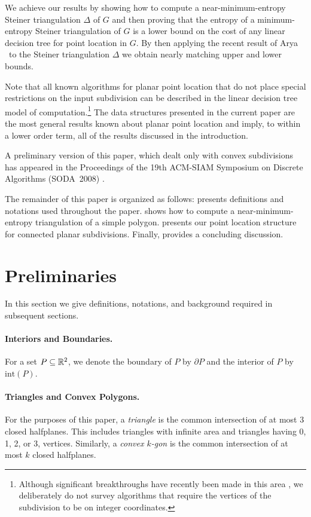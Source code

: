 \documentclass[lotsofwhite]{patmorin}
\newcommand{\boundary}{\partial}
\newcommand{\interior}{\mathrm{int}}
\begin{document}
We achieve our results by showing how to compute a
near-minimum-entropy Steiner triangulation $\Delta$ of $G$ and then
proving that the entropy of a minimum-entropy Steiner triangulation of
$G$ is a lower bound on the cost of any linear decision tree for point
location in $G$.  By then applying the recent result of Arya \etal\ to
the Steiner triangulation $\Delta$ we obtain nearly matching upper and
lower bounds.

Note that all known algorithms for planar point location that do not
place special restrictions on the input subdivision can be described
in the linear decision tree model of computation.\footnote{Although
significant breakthroughs have recently been made in this area
\cite{c06,p06}, we deliberately do not survey algorithms that require
the vertices of the subdivision to be on integer coordinates.}  The
data structures presented in the current paper are the most general
results known about planar point location and imply, to within a
lower order term, all of the results discussed in the introduction.

A preliminary version of this paper, which dealt only with convex
subdivisions has appeared in the Proceedings of the 19th ACM-SIAM
Symposium on Discrete Algorithms (SODA~2008) \cite{cdilm08}.

The remainder of this paper is organized as follows:  
presents definitions and notations used throughout the paper.
 shows how to compute a near-minimum-entropy
triangulation of a simple polygon.   presents our
point location structure for connected planar subdivisions.  Finally,
 provides a concluding discussion.


\section{Preliminaries}

In this section we give definitions, notations, and background
required in subsequent sections.

\paragraph{Interiors and Boundaries.}
For a set $P\subseteq \mathbb{R}^2$, we denote the boundary of $P$ by $\boundary P$
and the interior of $P$ by $\interior(P)$.


\paragraph{Triangles and Convex Polygons.}  For the purposes of this
paper, a \emph{triangle} is the common intersection of at most 3
closed halfplanes.  This includes triangles with infinite area and
triangles having 0, 1, 2, or 3, vertices. Similarly, a \emph{convex
$k$-gon} is the common intersection of at most $k$ closed halfplanes.
\end{document}

